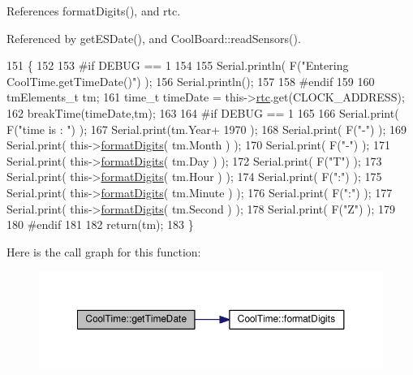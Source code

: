 References format\+Digits(), and rtc.



Referenced by get\+E\+S\+Date(), and Cool\+Board\+::read\+Sensors().


\begin{DoxyCode}
151 \{
152 
153 \textcolor{preprocessor}{#if DEBUG == 1 }
154     
155     Serial.println( F(\textcolor{stringliteral}{"Entering CoolTime.getTimeDate()"}) );
156     Serial.println();
157 
158 \textcolor{preprocessor}{#endif}
159 
160     tmElements\_t tm;
161     time\_t timeDate = this->\hyperlink{classCoolTime_abd38f2384ff90692b1568d9db869412e}{rtc}.get(CLOCK\_ADDRESS);
162     breakTime(timeDate,tm);
163 
164 \textcolor{preprocessor}{#if DEBUG == 1}
165     
166     Serial.print( F(\textcolor{stringliteral}{"time is : "}) );
167     Serial.print(tm.Year+ 1970 );
168     Serial.print( F(\textcolor{stringliteral}{"-"}) );
169     Serial.print( this->\hyperlink{classCoolTime_acd537cd4210d7bde4e1f5c47d2ac0456}{formatDigits}( tm.Month ) );
170     Serial.print( F(\textcolor{stringliteral}{"-"}) );
171     Serial.print( this->\hyperlink{classCoolTime_acd537cd4210d7bde4e1f5c47d2ac0456}{formatDigits}( tm.Day ) );
172     Serial.print( F(\textcolor{stringliteral}{"T"}) );
173     Serial.print( this->\hyperlink{classCoolTime_acd537cd4210d7bde4e1f5c47d2ac0456}{formatDigits}( tm.Hour ) );
174     Serial.print( F(\textcolor{stringliteral}{":"}) );
175     Serial.print( this->\hyperlink{classCoolTime_acd537cd4210d7bde4e1f5c47d2ac0456}{formatDigits}( tm.Minute ) );
176     Serial.print( F(\textcolor{stringliteral}{":"}) );
177     Serial.print( this->\hyperlink{classCoolTime_acd537cd4210d7bde4e1f5c47d2ac0456}{formatDigits}( tm.Second ) );
178     Serial.print( F(\textcolor{stringliteral}{"Z"}) );
179 
180 \textcolor{preprocessor}{#endif}
181     
182     \textcolor{keywordflow}{return}(tm);
183 \}
\end{DoxyCode}
Here is the call graph for this function\+:
\nopagebreak
\begin{figure}[H]
\begin{center}
\leavevmode
\includegraphics[width=350pt]{classCoolTime_a7a7501c5ca77dd1248bea704c44f986c_cgraph}
\end{center}
\end{figure}
